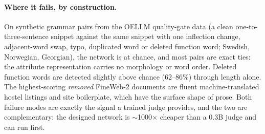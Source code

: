 \paragraph{Where it fails, by construction.} On synthetic grammar pairs from
the OELLM quality-gate data (a clean one-to-three-sentence snippet against the
same snippet with one inflection change, adjacent-word swap, typo, duplicated
word or deleted function word; Swedish, Norwegian, Georgian), the network is at
chance, and most pairs are exact ties: the attribute representation carries no
morphology or word order. Deleted function words are detected slightly above
chance (62--86\%) through length alone. The highest-scoring \emph{removed}
FineWeb-2 documents are fluent machine-translated hostel listings and
site boilerplate, which have the surface shape of prose. Both failure modes are
exactly the signal a trained judge provides, and the two are complementary:
the designed network is $\sim$1000$\times$ cheaper than a 0.3B judge and can run
first.

